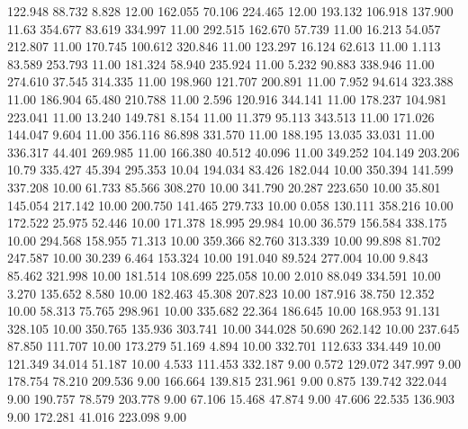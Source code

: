  122.948   88.732    8.828        12.00
 162.055   70.106  224.465        12.00
 193.132  106.918  137.900        11.63
 354.677   83.619  334.997        11.00
 292.515  162.670   57.739        11.00
  16.213   54.057  212.807        11.00
 170.745  100.612  320.846        11.00
 123.297   16.124   62.613        11.00
   1.113   83.589  253.793        11.00
 181.324   58.940  235.924        11.00
   5.232   90.883  338.946        11.00
 274.610   37.545  314.335        11.00
 198.960  121.707  200.891        11.00
   7.952   94.614  323.388        11.00
 186.904   65.480  210.788        11.00
   2.596  120.916  344.141        11.00
 178.237  104.981  223.041        11.00
  13.240  149.781    8.154        11.00
  11.379   95.113  343.513        11.00
 171.026  144.047    9.604        11.00
 356.116   86.898  331.570        11.00
 188.195   13.035   33.031        11.00
 336.317   44.401  269.985        11.00
 166.380   40.512   40.096        11.00
 349.252  104.149  203.206        10.79
 335.427   45.394  295.353        10.04
 194.034   83.426  182.044        10.00
 350.394  141.599  337.208        10.00
  61.733   85.566  308.270        10.00
 341.790   20.287  223.650        10.00
  35.801  145.054  217.142        10.00
 200.750  141.465  279.733        10.00
   0.058  130.111  358.216        10.00
 172.522   25.975   52.446        10.00
 171.378   18.995   29.984        10.00
  36.579  156.584  338.175        10.00
 294.568  158.955   71.313        10.00
 359.366   82.760  313.339        10.00
  99.898   81.702  247.587        10.00
  30.239    6.464  153.324        10.00
 191.040   89.524  277.004        10.00
   9.843   85.462  321.998        10.00
 181.514  108.699  225.058        10.00
   2.010   88.049  334.591        10.00
   3.270  135.652    8.580        10.00
 182.463   45.308  207.823        10.00
 187.916   38.750   12.352        10.00
  58.313   75.765  298.961        10.00
 335.682   22.364  186.645        10.00
 168.953   91.131  328.105        10.00
 350.765  135.936  303.741        10.00
 344.028   50.690  262.142        10.00
 237.645   87.850  111.707        10.00
 173.279   51.169    4.894        10.00
 332.701  112.633  334.449        10.00
 121.349   34.014   51.187        10.00
   4.533  111.453  332.187         9.00
   0.572  129.072  347.997         9.00
 178.754   78.210  209.536         9.00
 166.664  139.815  231.961         9.00
   0.875  139.742  322.044         9.00
 190.757   78.579  203.778         9.00
  67.106   15.468   47.874         9.00
  47.606   22.535  136.903         9.00
 172.281   41.016  223.098         9.00
